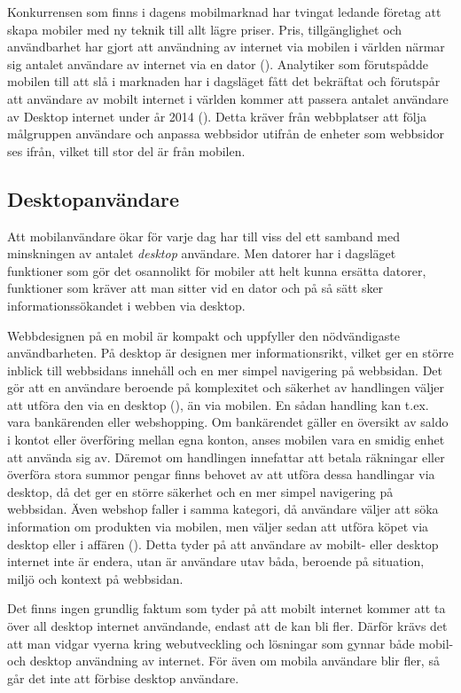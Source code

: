\documentclass[11pt]{article}
\begin{document}
Konkurrensen som finns i dagens mobilmarknad har tvingat ledande företag att skapa mobiler med ny teknik till allt lägre priser. Pris, tillgänglighet och användbarhet har gjort att användning av internet via mobilen i världen närmar sig antalet användare av internet via en dator (\cite{morganstanley}). Analytiker som förutspådde mobilen till att slå i marknaden har i dagsläget fått det bekräftat och förutspår att användare av mobilt internet i världen kommer att passera antalet användare av Desktop internet  under år 2014 (\cite{morganstanley}). Detta kräver från webbplatser att följa målgruppen användare och anpassa webbsidor utifrån de enheter som webbsidor ses ifrån, vilket till stor del är från mobilen.

\subsection{Desktopanvändare}
Att mobilanvändare ökar för varje dag har till viss del ett samband med minskningen av antalet \textit{desktop} användare. Men datorer har i dagsläget funktioner som gör det osannolikt för mobiler att helt kunna ersätta datorer, funktioner som kräver att man sitter vid en dator och på så sätt sker informationssökandet i webben via desktop. 

Webbdesignen på en mobil är kompakt och uppfyller den nödvändigaste användbarheten.
På desktop är designen mer informationsrikt, vilket ger en större inblick till webbsidans innehåll och en mer simpel navigering på webbsidan. Det gör att en användare beroende på komplexitet och säkerhet av handlingen väljer att utföra den via en desktop (\cite{userbeh}), än via mobilen. En sådan handling kan t.ex. vara bankärenden eller webshopping. Om bankärendet gäller en översikt av saldo i kontot eller överföring mellan egna konton, anses mobilen vara en smidig enhet att använda sig av. Däremot om handlingen innefattar att betala räkningar eller överföra stora summor pengar finns behovet av att utföra dessa handlingar via desktop, då det ger en större säkerhet och en mer simpel navigering på webbsidan. Även webshop faller i samma kategori, då användare väljer att söka information om produkten via mobilen, men väljer sedan att utföra köpet via desktop eller i affären (\cite{userbeh}). Detta tyder på att användare av mobilt- eller desktop internet inte är endera, utan är användare utav båda, beroende på situation, miljö och kontext på webbsidan.

Det finns ingen grundlig faktum som tyder på att mobilt internet kommer att ta över all desktop internet användande, endast att de kan bli fler. Därför krävs det att man vidgar vyerna kring webutveckling och lösningar som gynnar både mobil- och desktop användning av internet. För även om mobila användare blir fler, så går det inte att förbise desktop användare.
\newpage
\end{document}
